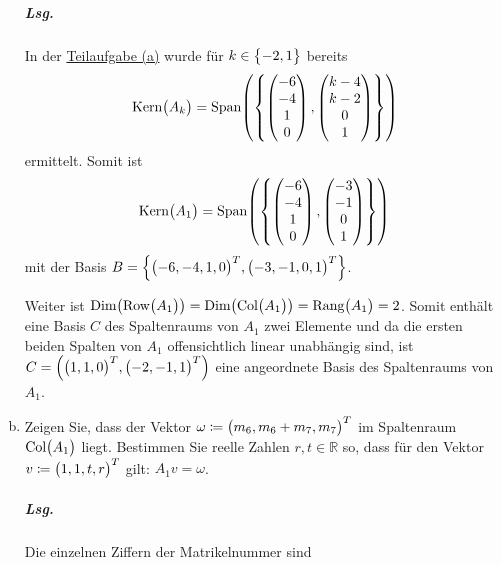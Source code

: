 \documentclass{scrreprt}
\begin{document}
\begin{enumerate}[(a)]
  \subparagraph{Lsg.} In der \hyperref[n_6_2_a]{Teilaufgabe (a)} wurde für
  $k \in \qty\big{-2, 1}$ bereits
  \[
    \text{Kern}\qty\big(A_k) = \text{Span}\qty(\qty{
      \begin{pmatrix}
        -6 \\
        -4 \\
        1  \\
        0  \\
      \end{pmatrix},
      \begin{pmatrix}
        k - 4 \\
        k - 2 \\
        0     \\
        1     \\
      \end{pmatrix}
    })
  \]
  ermittelt.
  Somit ist
  \[
    \text{Kern}\qty\big(A_1) = \text{Span}\qty(\qty{
      \begin{pmatrix}
        -6 \\
        -4 \\
        1  \\
        0  \\
      \end{pmatrix},
      \begin{pmatrix}
        -3 \\
        -1 \\
        0  \\
        1  \\
      \end{pmatrix}
    })
  \]
  mit der Basis $B = \qty{\qty\big(-6, -4, 1, 0)^T, \qty\big(-3, -1, 0, 1)^T}$.

  Weiter ist $\text{Dim}\qty(\text{Row}\qty\big(A_1)) =
  \text{Dim}\qty(\text{Col}\qty\big(A_1)) = \text{Rang}\qty\big(A_1) = 2$.
  Somit enthält eine Basis $C$ des Spaltenraums von $A_1$ zwei Elemente und da
  die ersten beiden Spalten von $A_1$ offensichtlich linear unabhängig sind, ist
  $C = \qty(\qty\big(1, 1, 0)^T, \qty\big(-2, -1, 1)^T)$ eine angeordnete Basis
  des Spaltenraums von $A_1$.

\newpage
\item \label{n_6_2_c} Zeigen Sie, dass der Vektor
  $\omega \coloneqq \qty\big(m_6, m_6 + m_7, m_7)^T$ im Spaltenraum
  $\text{Col}\qty\big(A_1)$ liegt.
  Bestimmen Sie reelle Zahlen $r, t \in \mathbb{R}$ so, dass für den Vektor
  $v \coloneqq \qty\big(1, 1, t, r)^T$ gilt:
  $A_1v = \omega$.

  \subparagraph{Lsg.} Die einzelnen Ziffern der Matrikelnummer sind


\end{enumerate}
\end{document}
